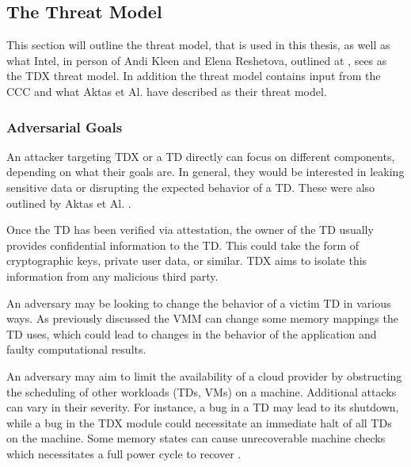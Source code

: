 \subsection{The Threat Model}

\label{Threat_Model}

This section will outline the threat model, that is used in this thesis, as well as what Intel, in person of Andi Kleen and Elena Reshetova, outlined at \cite{elena_reshetova_intel_2023}, sees as the TDX threat model. In addition the threat model contains input from the CCC \cite{confidential_computing_consortium_ccc--technical-analysis--confidential-computing-v13_unlockedpdf_2023} and what Aktas et Al. have described as their threat model\cite{aktas_intel_nodate}.

\subsubsection{Adversarial Goals}

An attacker targeting TDX or a TD directly can focus on different components, depending on what their goals are. In general, they would be interested in leaking sensitive data or disrupting the expected behavior of a TD. These were also outlined by Aktas et Al. \cite{aktas_intel_nodate}.


Once the TD has been verified via attestation, the owner of the TD usually provides confidential information to the TD. This could take the form of cryptographic keys, private user data, or similar. TDX aims to isolate this information from any malicious third party.


An adversary may be looking to change the behavior of a victim TD in various ways. As previously discussed the VMM can change some memory mappings the TD uses, which could lead to changes in the behavior of the application and faulty computational results.


An adversary may aim to limit the availability of a cloud provider by obstructing the scheduling of other workloads (TDs, VMs) on a machine. Additional attacks can vary in their severity. For instance, a bug in a TD may lead to its shutdown, while a bug in the TDX module could necessitate an immediate halt of all TDs on the machine. Some memory states can cause unrecoverable machine checks which necessitates a full power cycle to recover \cite{aktas_intel_nodate}.

